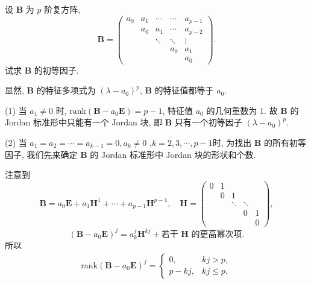 \documentclass[../../main.tex]{subfiles}%
\begin{document}
\begin{solution}
\end{solution}

\begin{example}
设 $\boldsymbol{B}$ 为 $p$ 阶复方阵,
\[
\boldsymbol{B} = \begin{pmatrix} 
a_0 & a_1 & \cdots & \cdots & a_{p-1} \\
& a_0 & a_1 & \cdots & a_{p-2} \\
& & \ddots & \ddots & \vdots \\
& & & a_0 & a_1 \\
& & & & a_0 
\end{pmatrix}.
\]
试求 $\boldsymbol{B}$ 的初等因子.
\end{example}
\begin{solution}
显然, $\boldsymbol{B}$ 的特征多项式为 $(\lambda - a_0)^p$, $\boldsymbol{B}$ 的特征值都等于 $a_0$.

(1) 当 $a_1 \neq 0$ 时, $\mathrm{rank}(\boldsymbol{B} - a_0\boldsymbol{E}) = p - 1$, 特征值 $a_0$ 的几何重数为 1. 故 $\boldsymbol{B}$ 的 Jordan 标准形中只能有一个 Jordan 块, 即 $\boldsymbol{B}$ 只有一个初等因子 $(\lambda - a_0)^p$.

(2) 当 $a_1 = a_2 = \cdots = a_{k-1} = 0, a_k \neq 0$ ,$k=2,3,\cdots,p-1$时, 为找出 $\boldsymbol{B}$ 的所有初等因子, 我们先来确定 $\boldsymbol{B}$ 的 Jordan 标准形中 Jordan 块的形状和个数.

注意到
\[
\boldsymbol{B} = a_0\boldsymbol{E} + a_1\boldsymbol{H}^1 + \cdots + a_{p-1}\boldsymbol{H}^{p-1}, \quad \boldsymbol{H} = \begin{pmatrix} 
0 & 1 & & \\
& 0 & 1 & \\
& & \ddots & \ddots \\
& & & 0 & 1 \\
& & & & 0 
\end{pmatrix},
\]
\[
(\boldsymbol{B} - a_0\boldsymbol{E})^j = a_k^j\boldsymbol{H}^{kj} + \text{若干 } \boldsymbol{H} \text{ 的更高幂次项}.
\]
所以
\begin{align}
\mathrm{rank}(\boldsymbol{B} - a_0\boldsymbol{E})^j = \begin{cases} 
0, & kj > p, \\
p - kj, & kj \leqslant p.
\end{cases}\label{eq::::::--000002}
\end{align}


\end{solution}
\end{document}
